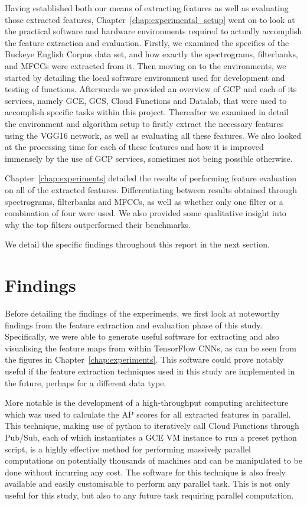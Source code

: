 Having established both our means of extracting features as well as evaluating those extracted features, Chapter~\ref{chap:experimental_setup} went on to look at the practical software and hardware environments required to actually accomplish the feature extraction and evaluation.
Firstly, we examined the specifics of the Buckeye English Corpus data set, and how exactly the spectrograms, filterbanks, and MFCCs were extracted from it.
Then moving on to the environments, we started by detailing the local software environment used for development and testing of functions.
Afterwards we provided an overview of GCP and each of its services, namely GCE, GCS, Cloud Functions and Datalab, that were used to accomplish specific tasks within this project.
Thereafter we examined in detail the environment and algorithm setup to firstly extract the necessary features using the VGG16 network, as well as evaluating all these features.
We also looked at the processing time for each of these features and how it is improved immensely by the use of GCP services, sometimes not being possible otherwise.

Chapter~\ref{chap:experiments} detailed the results of performing feature evaluation on all of the extracted features.
Differentiating between results obtained through spectrograms, filterbanks and MFCCs, as well as whether only one filter or a combination of four were used.
We also provided some qualitative insight into why the top filters outperformed their benchmarks.

We detail the specific findings throughout this report in the next section.

\section{Findings}

Before detailing the findings of the experiments, we first look at noteworthy findings from the feature extraction and evaluation phase of this study.
Specifically, we were able to generate useful software for extracting and also visualising the feature maps from within TensorFlow CNNs, as can be seen from the figures in Chapter~\ref{chap:experiments}.
This software could prove notably useful if the feature extraction techniques used in this study are implemented in the future, perhaps for a different data type.

More notable is the development of a high-throughput computing architecture which was used to calculate the AP scores for all extracted features in parallel.
This technique, making use of python to iteratively call Cloud Functions through Pub/Sub, each of which instantiates a GCE VM instance to run a preset python script, is a highly effective method for performing massively parallel computations on potentially thousands of machines and can be manipulated to be done without incurring any cost.
The software for this technique is also freely available and easily customisable to perform any parallel task.
This is not only useful for this study, but also to any future task requiring parallel computation.

